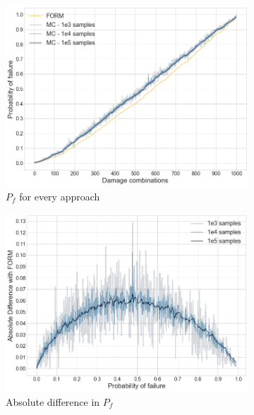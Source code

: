 \begin{figure}[H]
    \centering
    \begin{subfigure}[b]{0.48\textwidth}
        \centering
        \includegraphics[width=\textwidth]{Figures/FORMvsMCpfs.png}
        \caption{$P_f$ for every approach}
        \label{formMcPfs}
    \end{subfigure}
    \begin{subfigure}[b]{0.48\textwidth}
        \centering
        \includegraphics[width=\textwidth]{Figures/FORMvsMCabs.png}
        \caption{Absolute difference in $P_f$}
        \label{formMcAbsPf}
    \end{subfigure}
    \hfill
    \begin{subfigure}[b]{0.48\textwidth}

\end{subfigure}
\end{figure}

